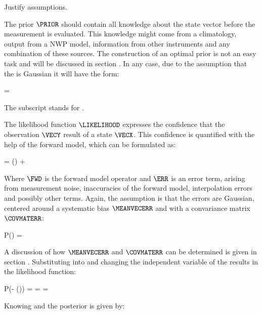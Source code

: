     Justify assumptions.

    The prior $\PRIOR$ should contain all knowledge about the state vector
    before the measurement is evaluated. This knowledge might come from
    a climatology, output from a NWP model, information from other instruments
    and any combination of these sources. The construction of an optimal prior
    is not an easy task and will be discussed in section .
    In any case, due to the assumption that the {\PDF} is Gaussian it will have
    the form:

    \startformula
        \PRIOR = \GAUSS{\VECX}{\MEANVECA}{\COVMATA}
    \stopformula

    The subscript stands for .

    The likelihood function $\LIKELIHOOD$ expresses the confidence that the
    observation $\VECY$ result of a state $\VECX$. This confidence is
    quantified with the help of the forward model, which can be formulated as:

    \startformula
        \VECY = \FWD(\VECX) + \ERR
    \stopformula

    Where $\FWD$ is the forward model operator and $\ERR$ is an error term,
    arising from measurement noise, inaccuracies of the forward model,
    interpolation errors and possibly other terms. Again, the assumption is
    that the errors are Gaussian, centered around a systematic bias
    $\MEANVECERR$ and with a convariance matrix $\COVMATERR$:

    \startformula
        P(\ERR) = \GAUSS{\ERR}{\MEANVECERR}{\COVMATERR}
    \stopformula

    A discussion of how $\MEANVECERR$ and $\COVMATERR$ can be determined is
    given in section . Substituting 
    into  and changing the independent variable of
    the {\PDF} results in the likelihood function:
    
    \placesubformula
    \startformula
    \startalign[n=3,align={right,middle,left}]
        \NC P(\VECY - \FWD(\VECX)) = \NC \GAUSS{\VECY - \FWD(\VECX)}{\MEANVECERR}{\COVMATERR} \NC \NR
        \NC = \NC \GAUSS{\VECY}{\FWD(\VECX)+\MEANVECERR}{\COVMATERR} \NC = \LIKELIHOOD {}
    \stopalign
    \stopformula

    Knowing  and  the
    posterior {\PDF} is given by:

